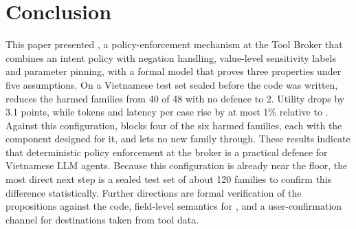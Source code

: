 \section{Conclusion}\label{sec:conclusion}

This paper presented \ours, a policy-enforcement mechanism at the Tool Broker that combines an intent policy with
negation handling, value-level sensitivity labels and parameter pinning, with a formal model that proves three
properties under five assumptions. On a Vietnamese test set sealed before the code was written, \ours{} reduces the
harmed families from 40 of 48 with no defence to 2. Utility drops by 3.1 points, while tokens and latency per case rise
by at most 1\% relative to \strSand. Against this configuration, \ours{} blocks four of the six harmed families, each
with the component designed for it, and lets no new family through. These results indicate that deterministic policy
enforcement at the broker is a practical defence for Vietnamese LLM agents. Because this configuration is already near
the floor, the most direct next step is a sealed test set of about 120 families to confirm this difference
statistically. Further directions are formal verification of the propositions against the code, field-level semantics
for \pThree, and a user-confirmation channel for destinations taken from tool data.
